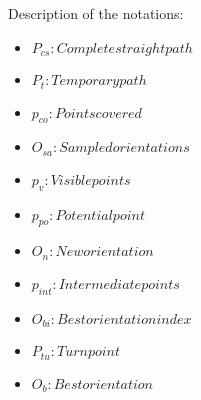 Description of the notations:
\begin{multicols}{2}
    \begin{itemize}[noitemsep,topsep=0pt]
        \item $P_{cs}: Complete straight path$
        \item $P_{t}: Temporary path$
        \item $p_{co}: Points covered$
        \item $O_{sa}: Sampled orientations$
        \item $p_v: Visible points$
        \item $p_{po}: Potential point$
        \item $O_n: New orientation$
        \item $p_{int}: Intermediate points$
        \item $O_{bi}: Best orientation index$
        \item $P_{tu}: Turn point$
        \item $O_b: Best orientation$
    \end{itemize}
\end{multicols}

